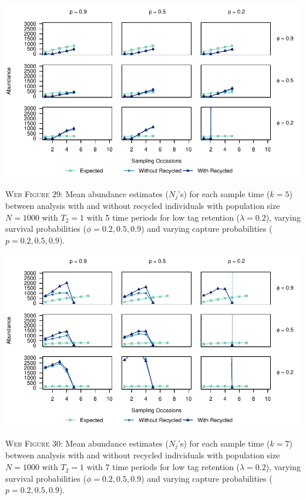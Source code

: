 \documentclass[]{article}
\begin{document}
\includegraphics{Appendix_files/figure-latex/29_abundance_L_GJSTL5-1.pdf}

\textsc{Web Figure 29:} Mean abundance estimates (\(N_j\)'s) for each
sample time (\(k=5\)) between analysis with and without recycled
individuals with population size \(N=1000\) with \(T_2=1\) with 5 time
periods for low tag retention (\(\lambda=0.2\)), varying survival
probabilities (\(\phi=0.2,0.5,0.9\)) and varying capture probabilities
(\(p=0.2,0.5,0.9\)).

\includegraphics{Appendix_files/figure-latex/30_abundance_L_GJSTL6-1.pdf}

\textsc{Web Figure 30:} Mean abundance estimates (\(N_j\)'s) for each
sample time (\(k=7\)) between analysis with and without recycled
individuals with population size \(N=1000\) with \(T_2=1\) with 7 time
periods for low tag retention (\(\lambda=0.2\)), varying survival
probabilities (\(\phi=0.2,0.5,0.9\)) and varying capture probabilities
(\(p=0.2,0.5,0.9\)).

\newpage
\end{document}
